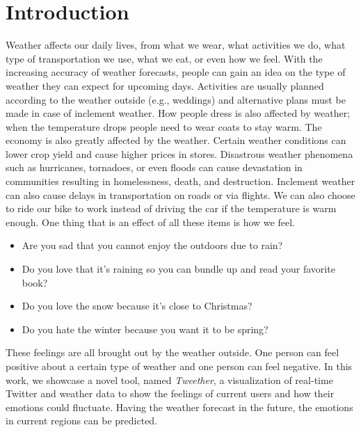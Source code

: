 \maketitle
\chapter{Introduction}

Weather affects our daily lives, from what we wear, what activities we do, what type of transportation we use, what we eat, or even how we feel. With the increasing accuracy of weather forecasts, people can gain an idea on the type of weather they can expect for upcoming days. Activities are usually planned according to the weather outside (e.g., weddings) and alternative plans must be made in case of inclement weather. How people dress is also affected by weather; when the temperature drops people need to wear coats to stay warm. The economy is also greatly affected by the weather. Certain weather conditions can lower crop yield and cause higher prices in stores. Disastrous weather phenomena such as hurricanes, tornadoes, or even floods can cause devastation in communities resulting in homelessness, death, and destruction. Inclement weather can also cause delays in transportation on roads or via flights. We can also choose to ride our bike to work instead of driving the car if the temperature is warm enough. One thing that is an effect of all these items is how we feel.
\begin{itemize}
\vspace{-.1in}
\setlength{\topsep}{-0.1in}
\setlength{\itemsep}{-0.05in}
\item Are you sad that you cannot enjoy the outdoors due to rain?
\item Do you love that it's raining so you can bundle up and read your favorite book?
\item Do you love the snow because it's close to Christmas?
\item Do you hate the winter because you want it to be spring?
\end{itemize}
\vspace{-0.05in}
These feelings are all brought out by the weather outside. One person can feel positive about a certain type of weather and one person can feel negative. In this work, we showcase a novel tool, named \emph{Tweether}, a visualization of real-time Twitter and weather data to show the feelings of current users and how their emotions could fluctuate. Having the weather forecast %
in the future, the emotions in current regions can be predicted.

